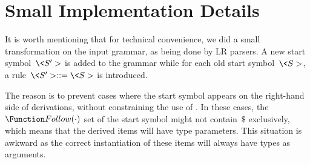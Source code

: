 \section{Small Implementation Details}
It is worth mentioning that for technical convenience, we did a small
transformation on the input grammar, as being done by LR parsers.
A new start symbol~$\<S'>$ is added to the grammar while for each old
start symbol~$\<S>$, a rule~$\<S'> ::= \<S>$ is introduced.

The reason is to prevent cases where the start symbol appears on the
right-hand side of derivations, without constraining the use of \Fajita.
In these cases, the $\Function Follow(\cdot)$ set of the start symbol
might not contain~$\$$ exclusively, which means that the derived items
will have type parameters. This situation is awkward as the correct instantiation
of these items will always have  types as arguments.
